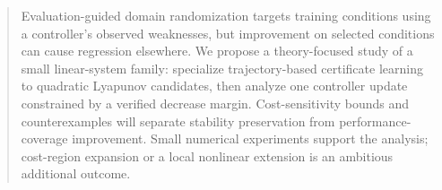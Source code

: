 \begin{abstract}%
Evaluation-guided domain randomization targets training conditions using a
controller's observed weaknesses, but improvement on selected conditions can
cause regression elsewhere. We propose a theory-focused study of a small
linear-system family: specialize trajectory-based certificate learning to
quadratic Lyapunov candidates, then analyze one controller update constrained
by a verified decrease margin. Cost-sensitivity bounds and counterexamples will
separate stability preservation from performance-coverage improvement. Small
numerical experiments support the analysis; cost-region expansion or a local
nonlinear extension is an ambitious additional outcome.%
\end{abstract}